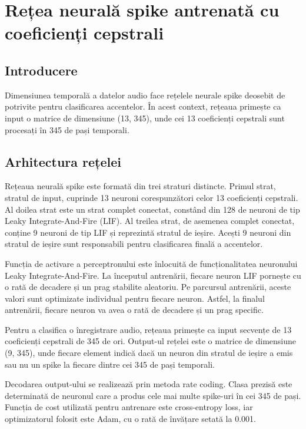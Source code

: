 \section{Rețea neurală spike antrenată cu coeficienți cepstrali}

\subsection{Introducere}

Dimensiunea temporală a datelor audio face rețelele neurale spike deosebit de potrivite pentru clasificarea accentelor. În acest context, rețeaua primește ca input o matrice de dimensiune (13, 345), unde cei 13 coeficienți cepstrali sunt procesați în 345 de pași temporali.


\subsection{Arhitectura rețelei}

Rețeaua neurală spike este formată din trei straturi distincte. Primul strat, stratul de input, cuprinde 13 neuroni corespunzători celor 13 coeficienți cepstrali. Al doilea strat este un strat complet conectat, constând din 128 de neuroni de tip Leaky Integrate-And-Fire (LIF). Al treilea strat, de asemenea complet conectat, conține 9 neuroni de tip LIF și reprezintă stratul de ieșire. Acești 9 neuroni din stratul de ieșire sunt responsabili pentru clasificarea finală a accentelor.

Funcția de activare a perceptronului este înlocuită de funcționalitatea neuronului Leaky Integrate-And-Fire. La începutul antrenării, fiecare neuron LIF pornește cu o rată de decadere și un prag stabilite aleatoriu. Pe parcursul antrenării, aceste valori sunt optimizate individual pentru fiecare neuron. Astfel, la finalul antrenării, fiecare neuron va avea o rată de decadere și un prag specific.

Pentru a clasifica o înregistrare audio, rețeaua primește ca input secvențe de 13 coeficienți cepstrali de 345 de ori. Output-ul rețelei este o matrice de dimensiune (9, 345), unde fiecare element indică dacă un neuron din stratul de ieșire a emis sau nu un spike la fiecare dintre cei 345 de pași temporali.

Decodarea output-ului se realizează prin metoda rate coding. Clasa prezisă este determinată de neuronul care a produs cele mai multe spike-uri în cei 345 de pași. Funcția de cost utilizată pentru antrenare este cross-entropy loss, iar optimizatorul folosit este Adam, cu o rată de învățare setată la 0.001.

